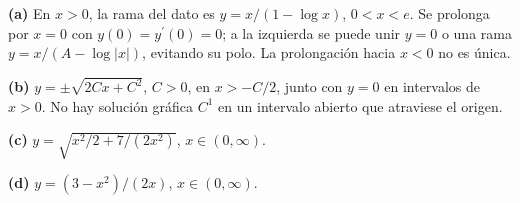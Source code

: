 \noindent\textbf{(a)} En $x>0$, la rama del dato es $y=x/(1-\log x)$, $0<x<e$. Se prolonga por $x=0$ con $y(0)=y^{\prime}(0)=0$; a la izquierda se puede unir $y=0$ o una rama $y=x/(A-\log|x|)$, evitando su polo. La prolongación hacia $x<0$ no es única.

\noindent\textbf{(b)} $y=\pm\sqrt{2Cx+C^2}$, $C>0$, en $x>-C/2$, junto con $y=0$ en intervalos de $x>0$. No hay solución gráfica $C^1$ en un intervalo abierto que atraviese el origen.

\noindent\textbf{(c)} $y=\sqrt{x^2/2+7/(2x^2)}$, $x\in(0,\infty)$.

\noindent\textbf{(d)} $y=(3-x^2)/(2x)$, $x\in(0,\infty)$.

